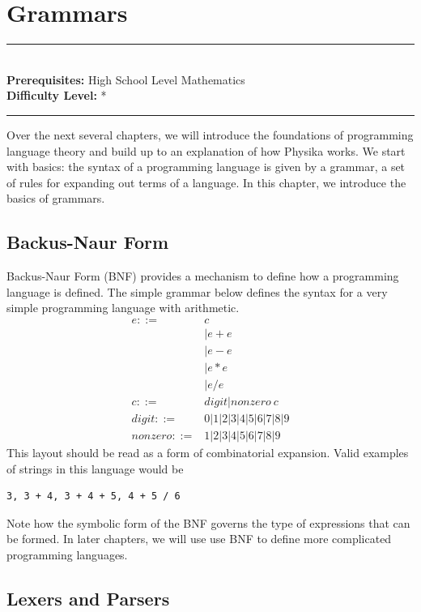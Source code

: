 \documentclass[book.tex]{subfiles}
\begin{document}
\chapter{Grammars}

\label{chap:grammar}
\noindent\rule{11cm}{0.4pt} \\
\textbf{Prerequisites:}  High School Level Mathematics  \\
\textbf{Difficulty Level:} * \\
\noindent\rule{11cm}{0.4pt}
\vspace{5mm}

Over the next several chapters, we will introduce the foundations of programming language theory and build up to an explanation of how Physika works. We start with basics: the syntax of a programming language is given by a grammar, a set of rules for expanding out terms of a language. In this chapter, we introduce the basics of grammars.

\section{Backus-Naur Form}
Backus-Naur Form (BNF) provides a mechanism to define how a programming language is defined. The simple grammar below defines the syntax for a very simple programming language with arithmetic.
\begin{align}
    e ::= & c  \\
    &| e + e \\
    &| e - e \\
    &| e * e \\
    &| e / e \\
    c ::= & digit | nonzero\ c \\
    digit ::= & 0 | 1 | 2 | 3 | 4 | 5 | 6 | 7 | 8 | 9 \\
    nonzero ::=  & 1 | 2 | 3 | 4 | 5 | 6 | 7 | 8 | 9
\end{align}
This layout should be read as a form of combinatorial expansion. Valid examples of strings in this language would be
\begin{lstlisting}
3, 3 + 4, 3 + 4 + 5, 4 + 5 / 6
\end{lstlisting}
Note how the symbolic form of the BNF governs the type of expressions that can be formed. In later chapters, we will use use BNF to define more complicated programming languages.

\section{Lexers and Parsers}
\end{document}
